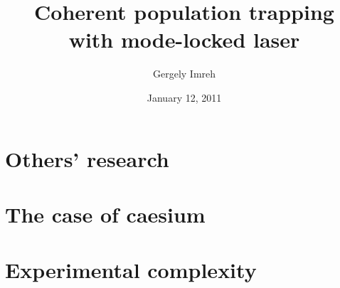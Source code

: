\documentclass{beamer}
\title[Comb CPT]{Coherent population trapping\\with mode-locked laser}
\author{Gergely Imreh}
\date{January 12, 2011}
\begin{document}
\frame{\titlepage}

\section[Outline]{}
\frame{\tableofcontents}


\section{Others' research}


\section{The case of caesium}


\section{Experimental complexity}





\end{document}
